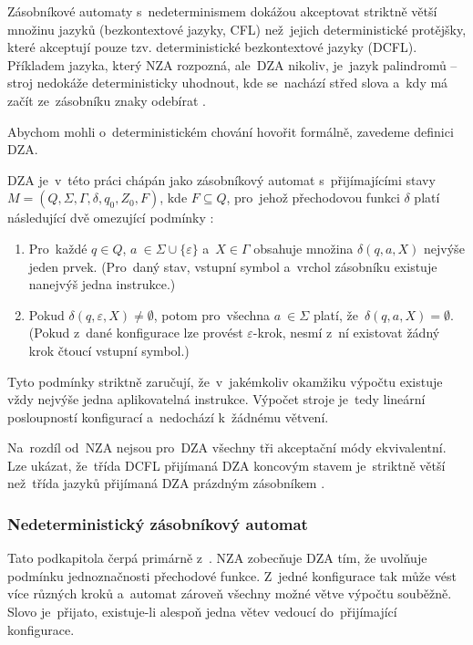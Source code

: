 \documentclass[
  master,
  program=ainfvs,
  printversion,
  figures=false,
  tables=false,
  glossaries,
  index
]{kidiplom}
\begin{document}
Zásobníkové automaty s~nedeterminismem dokážou akceptovat striktně větší množinu
jazyků (bezkontextové jazyky, CFL) než~jejich deterministické protějšky, které
akceptují pouze tzv. deterministické bezkontextové jazyky (DCFL). Příkladem jazyka,
který \gls{NZA} rozpozná, ale~\gls{DZA} nikoliv, je~jazyk
palindromů -- stroj nedokáže deterministicky uhodnout, kde se~nachází střed slova
a~kdy má začít ze~zásobníku znaky odebírat \cite{cerna_fja}.

Abychom mohli o~deterministickém chování hovořit formálně, zavedeme definici
\gls{DZA}.

\begin{definition}
\gls{DZA} je~v~této práci chápán jako zásobníkový automat s~přijímajícími stavy
$M = (Q, \Sigma, \Gamma, \delta, q_0, Z_0, F)$, kde $F \subseteq Q$, pro~jehož
přechodovou funkci $\delta$
platí následující dvě omezující podmínky \cite[kapitola~5.2]{jancar_ti}:
\begin{enumerate}
    \item Pro~každé $q \in Q$, $a~\in \Sigma \cup \{\varepsilon\}$ a~$X \in \Gamma$
    obsahuje množina $\delta(q, a, X)$ nejvýše jeden prvek. (Pro~daný stav, vstupní
    symbol a~vrchol zásobníku existuje nanejvýš jedna instrukce.)
    \item Pokud $\delta(q, \varepsilon, X) \neq \emptyset$, potom pro~všechna
    $a~\in \Sigma$ platí, že~$\delta(q, a, X) = \emptyset$. (Pokud z~dané
    konfigurace lze provést $\varepsilon$-krok, nesmí z~ní existovat žádný krok
    čtoucí vstupní symbol.)
\end{enumerate}
\end{definition}

Tyto podmínky striktně zaručují, že~v~jakémkoliv okamžiku výpočtu existuje vždy
nejvýše jedna aplikovatelná instrukce. Výpočet stroje je~tedy lineární posloupností
konfigurací a~nedochází k~žádnému větvení.

Na~rozdíl od~\gls{NZA} nejsou pro~\gls{DZA} všechny tři akceptační
módy ekvivalentní. Lze ukázat, že~třída DCFL přijímaná \gls{DZA} koncovým stavem
je~striktně větší než~třída jazyků přijímaná \gls{DZA} prázdným zásobníkem
\cite[kapitola~5.2]{jancar_ti}. 

\subsubsection{Nedeterministický zásobníkový automat}
Tato podkapitola čerpá primárně z~\cite[kapitola~4]{jancar_ti}.
\gls{NZA} zobecňuje \gls{DZA} tím, že
uvolňuje podmínku jednoznačnosti přechodové funkce. Z~jedné konfigurace tak může
vést více různých kroků a~automat zároveň  všechny možné větve
výpočtu souběžně. Slovo je~přijato, existuje-li alespoň jedna větev
vedoucí do~přijímající konfigurace.
\end{document}
